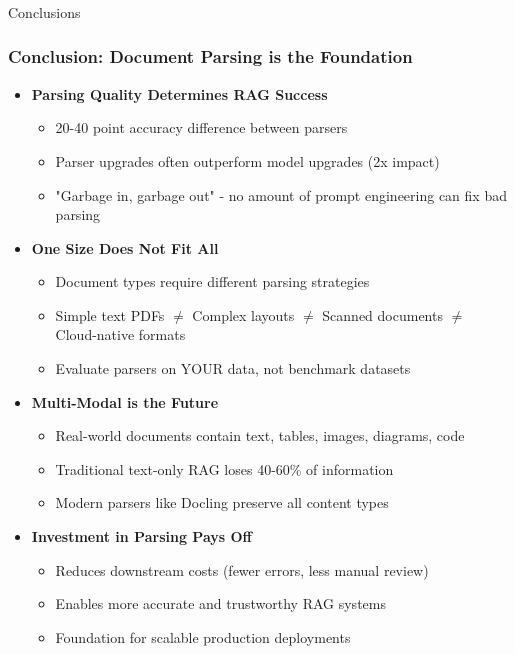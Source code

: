 \begin{frame}[fragile]\frametitle{}
\begin{center}
{\Large Conclusions}

\end{center}
\end{frame}

\begin{frame}[fragile]\frametitle{Conclusion: Document Parsing is the Foundation}
      \begin{itemize}
        \item \textbf{Parsing Quality Determines RAG Success}
        \begin{itemize}
            \item 20-40 point accuracy difference between parsers
            \item Parser upgrades often outperform model upgrades (2x impact)
            \item "Garbage in, garbage out" - no amount of prompt engineering can fix bad parsing
        \end{itemize}
        \item \textbf{One Size Does Not Fit All}
        \begin{itemize}
            \item Document types require different parsing strategies
            \item Simple text PDFs $\neq$ Complex layouts $\neq$ Scanned documents $\neq$ Cloud-native formats
            \item Evaluate parsers on YOUR data, not benchmark datasets
        \end{itemize}
        \item \textbf{Multi-Modal is the Future}
        \begin{itemize}
            \item Real-world documents contain text, tables, images, diagrams, code
            \item Traditional text-only RAG loses 40-60\% of information
            \item Modern parsers like Docling preserve all content types
        \end{itemize}
        \item \textbf{Investment in Parsing Pays Off}
        \begin{itemize}
            \item Reduces downstream costs (fewer errors, less manual review)
            \item Enables more accurate and trustworthy RAG systems
            \item Foundation for scalable production deployments
        \end{itemize}
      \end{itemize}
\end{frame}

